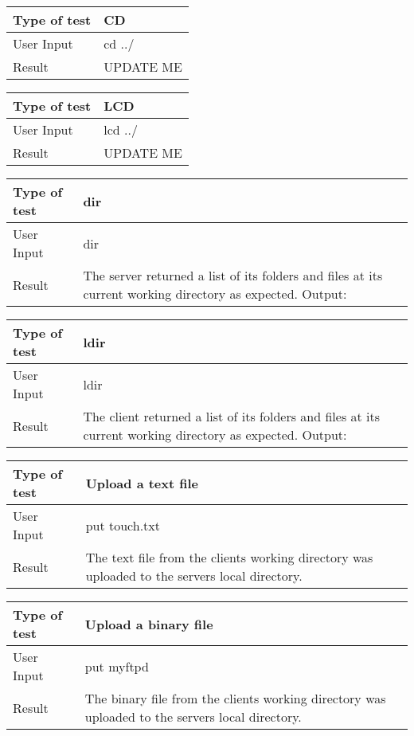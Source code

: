 \documentclass{article}
\begin{document}
    \newline
    \begin{tabulary}{1.0\textwidth}{|L|L|}
    \hline Type of test & CD\\
    \hline User Input & cd ../\\
    \hline Result & UPDATE ME\\
    \hline
    \end{tabulary}
    \newline
    \begin{tabulary}{1.0\textwidth}{|L|L|}
    \hline Type of test & LCD\\
    \hline User Input & lcd ../\\
    \hline Result & UPDATE ME\\
    \hline
    \end{tabulary}
    \newline
    \begin{tabulary}{1.0\textwidth}{|L|L|}
    \hline Type of test & dir\\
    \hline User Input & dir\\
    \hline Result & The server returned a list of its folders and files at its current working directory as expected. Output: \\
    \hline
    \end{tabulary}
    \newline
    \begin{tabulary}{1.0\textwidth}{|L|L|}
    \hline Type of test & ldir\\
    \hline User Input & ldir\\
    \hline Result & The client returned a list of its folders and files at its current working directory as expected. Output: \\
    \hline
    \end{tabulary}
    \newline
    \begin{tabulary}{1.0\textwidth}{|L|L|}
    \hline Type of test & Upload a text file\\
    \hline User Input & put touch.txt\\
    \hline Result & The text file from the clients working directory was uploaded to the servers local directory.\\
    \hline
    \end{tabulary}
    \newline
    \begin{tabulary}{1.0\textwidth}{|L|L|}
    \hline Type of test & Upload a binary file\\
    \hline User Input & put myftpd\\
    \hline Result & The binary file from the clients working directory was uploaded to the servers local directory. \\
    \hline
    \end{tabulary}
\end{document}
